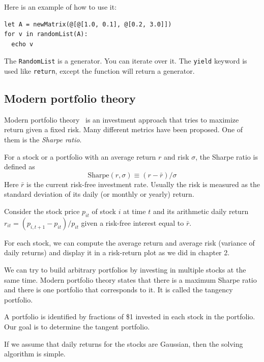 \documentclass[justified, sixbynine]{tufte-book}
\def\ft{\small\tt}
\theoremstyle{plain}%
\newtheorem * {corollary}{Corollary}
\theoremstyle{definition}
\theoremstyle{remark}
\newtheorem * {remark}{Remark}
\newtheorem * {note}{Note}
\begin{document}
\begin{fullwidth}
Here is an example of how to use it:

\begin{lstlisting}
let A = newMatrix(@[@[1.0, 0.1], @[0.2, 3.0]])
for v in randomList(A):
  echo v
\end{lstlisting}

The {\ft RandomList} is a generator. You can iterate over it. The {\ft yield} keyword is used like {\ft return}, except the function will return a generator.

\goodbreak\subsection{Modern portfolio theory}


Modern portfolio theory~\cite{mpt} is an investment approach that tries to maximize return given a fixed risk. Many different metrics have been proposed. One of them is the {\it Sharpe ratio}.

For a stock or a portfolio with an average return $r$ and risk $\sigma$, the Sharpe ratio is defined as
\begin{equation}
\textrm{Sharpe}(r, \sigma) \equiv (r-\bar r)/\sigma
\end{equation}
Here $\bar r$ is the current risk-free investment rate. Usually the risk is measured as the standard deviation of its daily (or monthly or yearly) return.

Consider the stock price $p_{it}$ of stock $i$ at time $t$ and its arithmetic daily return
$r_{it}=(p_{i, t+1}-p_{it})/p_{it}$ given a risk-free interest equal to $\bar r$.

For each stock, we can compute the average return and average risk (variance of daily returns) and display it in a risk-return plot as we did in chapter 2.

We can try to build arbitrary portfolios by investing in multiple stocks at the same time. Modern portfolio theory states that there is a maximum Sharpe ratio and there is one portfolio that corresponds to it. It is called the tangency portfolio.

A portfolio is identified by fractions of \$1 invested in each stock in the portfolio. Our goal is to determine the tangent portfolio.

If we assume that daily returns for the stocks are Gaussian, then the solving algorithm is simple.


\end{fullwidth}
\end{document}
